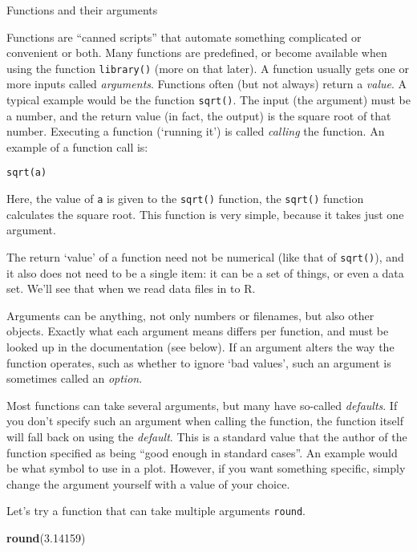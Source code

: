 \documentclass[
  11pt,
  ignorenonframetext,
]{beamer}
\newenvironment{Shaded}{\begin{snugshade}}{\end{snugshade}}
\newcommand{\FloatTok}[1]{\textcolor[rgb]{0.00,0.00,0.81}{#1}}
\newcommand{\KeywordTok}[1]{\textcolor[rgb]{0.13,0.29,0.53}{\textbf{#1}}}
\newcommand{\NormalTok}[1]{#1}
\begin{document}
\begin{frame}[fragile]{Functions and their arguments}
\protect\hypertarget{functions-and-their-arguments}{}

Functions are ``canned scripts'' that automate something complicated or
convenient or both. Many functions are predefined, or become available
when using the function \texttt{library()} (more on that later). A
function usually gets one or more inputs called \emph{arguments}.
Functions often (but not always) return a \emph{value}. A typical
example would be the function \texttt{sqrt()}. The input (the argument)
must be a number, and the return value (in fact, the output) is the
square root of that number. Executing a function (`running it') is
called \emph{calling} the function. An example of a function call is:

\texttt{sqrt(a)}

Here, the value of \texttt{a} is given to the \texttt{sqrt()} function,
the \texttt{sqrt()} function calculates the square root. This function
is very simple, because it takes just one argument.

The return `value' of a function need not be numerical (like that of
\texttt{sqrt()}), and it also does not need to be a single item: it can
be a set of things, or even a data set. We'll see that when we read data
files in to R.

Arguments can be anything, not only numbers or filenames, but also other
objects. Exactly what each argument means differs per function, and must
be looked up in the documentation (see below). If an argument alters the
way the function operates, such as whether to ignore `bad values', such
an argument is sometimes called an \emph{option}.

Most functions can take several arguments, but many have so-called
\emph{defaults}. If you don't specify such an argument when calling the
function, the function itself will fall back on using the
\emph{default}. This is a standard value that the author of the function
specified as being ``good enough in standard cases''. An example would
be what symbol to use in a plot. However, if you want something
specific, simply change the argument yourself with a value of your
choice.

Let's try a function that can take multiple arguments \texttt{round}.

\begin{Shaded}
\begin{Highlighting}[]
\KeywordTok{round}\NormalTok{(}\FloatTok{3.14159}\NormalTok{)}
\end{Highlighting}
\end{Shaded}


\end{frame}
\end{document}

